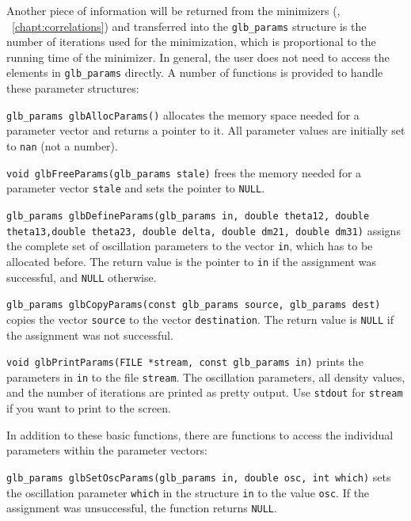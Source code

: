 Another piece of information will be returned from the minimizers 
(\cf, \Chapt~\ref{chapt:correlations}) and transferred
into the {\tt glb\_params} structure is the number
of iterations used for the minimization, which is proportional to the
running time of the minimizer. In general, the user does not need to
access the elements in {\tt glb\_params} directly. A number of functions
is provided to handle these parameter structures:
\begin{function}
{\tt glb\_params glbAllocParams()} allocates the memory space
needed for a parameter vector and returns a pointer to it. All parameter values are
initially set to {\tt nan} (not a number).
\end{function}
\begin{function}
{\tt void glbFreeParams(glb\_params stale)} frees the memory
needed for a parameter vector {\tt stale} and sets the pointer to {\tt NULL}.
\end{function}
\begin{function}
{\tt glb\_params glbDefineParams(glb\_params in, double theta12, double theta13,double theta23, double delta, double dm21, double dm31)} assigns
the complete set of oscillation parameters to the vector {\tt in}, which has
to be allocated before. The return value is the pointer to {\tt in} if 
the assignment was successful, and {\tt NULL} otherwise.
\end{function}
\begin{function}
 {\tt glb\_params glbCopyParams(const glb\_params source, glb\_params dest)}
 copies the vector {\tt source} to the vector {\tt destination}. The return
 value is {\tt NULL} if the assignment was not successful.
\end{function}
\begin{function}
{\tt void glbPrintParams(FILE *stream, const glb\_params in)} prints the
parameters in {\tt in} to the file {\tt stream}. The oscillation
parameters, all density values, and the number of iterations are
printed as pretty output. Use {\tt stdout} for {\tt stream} if you want
to print to the screen.
\end{function}
In addition to these basic functions, there are functions to access
the individual parameters within the parameter vectors:
\begin{function}
{\tt glb\_params glbSetOscParams(glb\_params in, double osc, int which)}
sets the oscillation parameter {\tt which} in the structure {\tt in}
to the value {\tt osc}. If the assignment was unsuccessful, the 
function returns {\tt NULL}.
\end{function}
